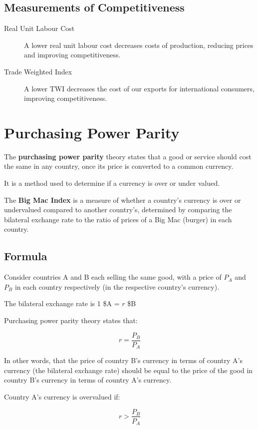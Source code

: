 \documentclass[a4paper,11pt]{report}
\begin{document}
\subsection{Measurements of Competitiveness}

\begin{description}
\item [Real Unit Labour Cost] A lower real unit labour cost decreases costs of
	production, reducing prices and improving competitiveness.
\item [Trade Weighted Index] A lower TWI decreases the cost of our exports for
	international consumers, improving competitiveness.
\end{description}


\section{Purchasing Power Parity}

The \textbf{purchasing power parity} theory states that a good or service
should cost the same in any country, once its price is converted to a common
currency.

It is a method used to determine if a currency is over or under valued.

The \textbf{Big Mac Index} is a measure of whether a country's currency is
over or undervalued compared to another country's, determined by comparing the
bilateral exchange rate to the ratio of prices of a Big Mac (burger) in each
country.

\subsection{Formula}

Consider countries A and B each selling the same good, with a price of $P_A$
and $P_B$ in each country respectively (in the respective country's currency).

The bilateral exchange rate is 1 \$A = $r$ \$B

Purchasing power parity theory states that:

$$
r = \frac{P_B}{P_A}
$$

In other words, that the price of country B's currency in terms of country A's
currency (the bilateral exchange rate) should be equal to the price of the good
in country B's currency in terms of country A's currency.

Country A's currency is overvalued if:

$$
r > \frac{P_B}{P_A}
$$
\end{document}
